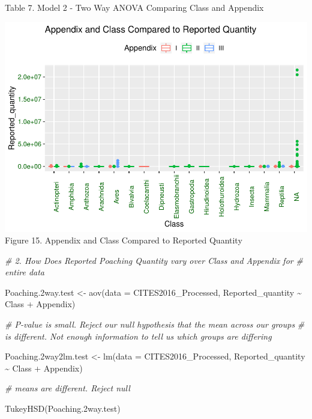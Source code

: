 \documentclass[
  12pt,
]{article}
\newenvironment{Shaded}{\begin{snugshade}}{\end{snugshade}}
\newcommand{\AttributeTok}[1]{\textcolor[rgb]{0.77,0.63,0.00}{#1}}
\newcommand{\CommentTok}[1]{\textcolor[rgb]{0.56,0.35,0.01}{\textit{#1}}}
\newcommand{\FloatTok}[1]{\textcolor[rgb]{0.00,0.00,0.81}{#1}}
\newcommand{\FunctionTok}[1]{\textcolor[rgb]{0.00,0.00,0.00}{#1}}
\newcommand{\NormalTok}[1]{#1}
\newcommand{\OtherTok}[1]{\textcolor[rgb]{0.56,0.35,0.01}{#1}}
\newcommand{\SpecialCharTok}[1]{\textcolor[rgb]{0.00,0.00,0.00}{#1}}
\begin{document}
Table 7. Model 2 - Two Way ANOVA Comparing Class and Appendix

\includegraphics{Wood_ENV872_Project_files/figure-latex/unnamed-chunk-26-1.pdf}
Figure 15. Appendix and Class Compared to Reported Quantity

\begin{Shaded}
\begin{Highlighting}[]
\CommentTok{\# 2. How Does Reported Poaching Quantity vary over Class and Appendix for}
\CommentTok{\# entire data}

\NormalTok{Poaching}\FloatTok{.2}\NormalTok{way.test }\OtherTok{\textless{}{-}} \FunctionTok{aov}\NormalTok{(}\AttributeTok{data =}\NormalTok{ CITES2016\_Processed, Reported\_quantity }\SpecialCharTok{\textasciitilde{}}\NormalTok{ Class }\SpecialCharTok{+}
\NormalTok{    Appendix)}

\CommentTok{\# P{-}value is small. Reject our null hypothesis that the mean across our groups}
\CommentTok{\# is different.  Not enough information to tell us which groups are differing}

\NormalTok{Poaching}\FloatTok{.2}\NormalTok{way2lm.test }\OtherTok{\textless{}{-}} \FunctionTok{lm}\NormalTok{(}\AttributeTok{data =}\NormalTok{ CITES2016\_Processed, Reported\_quantity }\SpecialCharTok{\textasciitilde{}}\NormalTok{ Class }\SpecialCharTok{+}
\NormalTok{    Appendix)}

\CommentTok{\# means are different. Reject null}

\FunctionTok{TukeyHSD}\NormalTok{(Poaching}\FloatTok{.2}\NormalTok{way.test)}
\end{Highlighting}
\end{Shaded}
\end{document}

